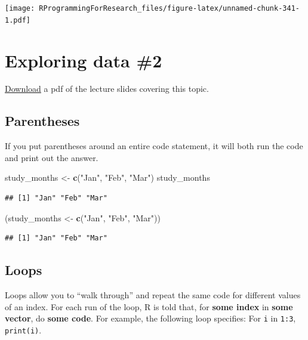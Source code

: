 \documentclass[]{book}
\makeatletter
\newenvironment{Shaded}{\begin{snugshade}}{\end{snugshade}}
\newcommand{\KeywordTok}[1]{\textcolor[rgb]{0.13,0.29,0.53}{\textbf{#1}}}
\newcommand{\StringTok}[1]{\textcolor[rgb]{0.31,0.60,0.02}{#1}}
\newcommand{\NormalTok}[1]{#1}
\newenvironment{kframe}{%
\medskip{}
\setlength{\fboxsep}{.8em}
 \def\at@end@of@kframe{}%
 \ifinner\ifhmode%
  \def\at@end@of@kframe{\end{minipage}}%
  \begin{minipage}{\columnwidth}%
 \fi\fi%
 \def\FrameCommand##1{\hskip\@totalleftmargin \hskip-\fboxsep
 \colorbox{shadecolor}{##1}\hskip-\fboxsep
     \hskip-\linewidth \hskip-\@totalleftmargin \hskip\columnwidth}%
 \MakeFramed {\advance\hsize-\width
   \@totalleftmargin\z@ \linewidth\hsize
   \@setminipage}}%
 {\par\unskip\endMakeFramed%
 \at@end@of@kframe}
\renewenvironment{Shaded}{\begin{kframe}}{\end{kframe}}
\theoremstyle{definition}
\theoremstyle{definition}
\theoremstyle{definition}
\theoremstyle{remark}
\makeatother
\begin{document}
\texttt{[image: RProgrammingForResearch\_files/figure-latex/unnamed-chunk-341-1.pdf]}

\chapter{Exploring data \#2}\label{exploring-data-2}

\href{https://github.com/geanders/RProgrammingForResearch/raw/master/slides/CourseNotes_Week7.pdf}{Download}
a pdf of the lecture slides covering this topic.

\section{Parentheses}\label{parentheses}

If you put parentheses around an entire code statement, it will both run
the code and print out the answer.

\begin{Shaded}
\begin{Highlighting}[]
\NormalTok{study_months <-}\StringTok{ }\KeywordTok{c}\NormalTok{(}\StringTok{"Jan"}\NormalTok{, }\StringTok{"Feb"}\NormalTok{, }\StringTok{"Mar"}\NormalTok{)}
\NormalTok{study_months}
\end{Highlighting}
\end{Shaded}

\begin{verbatim}
## [1] "Jan" "Feb" "Mar"
\end{verbatim}

\begin{Shaded}
\begin{Highlighting}[]
\NormalTok{(study_months <-}\StringTok{ }\KeywordTok{c}\NormalTok{(}\StringTok{"Jan"}\NormalTok{, }\StringTok{"Feb"}\NormalTok{, }\StringTok{"Mar"}\NormalTok{))}
\end{Highlighting}
\end{Shaded}

\begin{verbatim}
## [1] "Jan" "Feb" "Mar"
\end{verbatim}

\section{Loops}\label{loops}

Loops allow you to ``walk through'' and repeat the same code for
different values of an index. For each run of the loop, R is told that,
for \textbf{some index} in \textbf{some vector}, do \textbf{some code}.
For example, the following loop specifies: For \texttt{i} in
\texttt{1:3}, \texttt{print(i)}.
\end{document}
